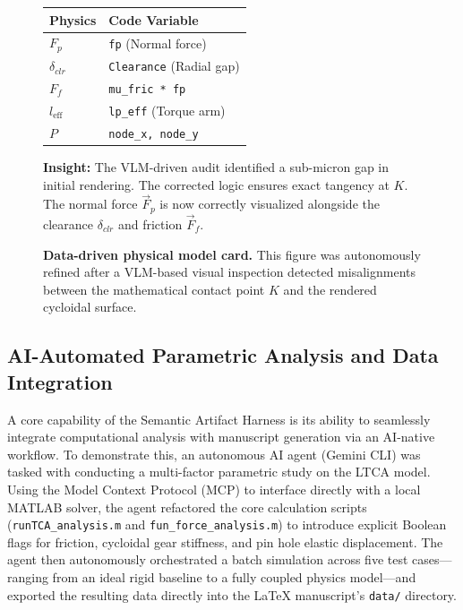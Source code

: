 \documentclass{article}
\begin{document}
\begin{figure}[t]
\begin{tcolorbox}[colback=green!2!white,colframe=green!50!black,title=Artifact Mapping Card: Floating Pin \& Friction Model,arc=4mm,boxrule=1pt]
\begin{minipage}{0.4\textwidth}
\begin{tabular}{>{\bfseries}p{1.25cm}p{3.7cm}}
\toprule
Physics & Code Variable \\
\midrule
$F_p$ & \texttt{fp} (Normal force) \\
$\delta_{clr}$ & \texttt{Clearance} (Radial gap) \\
$F_f$ & \texttt{mu\_fric * fp} \\
$l_{\mathrm{eff}}$ & \texttt{lp\_eff} (Torque arm) \\
$P$ & \texttt{node\_x, node\_y} \\
\bottomrule
\end{tabular}
\vspace{2mm}

\textbf{Insight:} The VLM-driven audit identified a sub-micron gap in initial rendering. The corrected logic ensures exact tangency at $K$. The normal force $\vec{F}_p$ is now correctly visualized alongside the clearance $\delta_{clr}$ and friction $\vec{F}_f$.
\end{minipage}
\end{tcolorbox}
\caption{\textbf{Data-driven physical model card.} This figure was autonomously refined after a VLM-based visual inspection detected misalignments between the mathematical contact point $K$ and the rendered cycloidal surface.}
\label{fig:physical_model}
\end{figure}

\subsection{AI-Automated Parametric Analysis and Data Integration}

A core capability of the Semantic Artifact Harness is its ability to seamlessly integrate computational analysis with manuscript generation via an AI-native workflow. To demonstrate this, an autonomous AI agent (Gemini CLI) was tasked with conducting a multi-factor parametric study on the LTCA model. Using the Model Context Protocol (MCP) to interface directly with a local MATLAB solver, the agent refactored the core calculation scripts (\texttt{runTCA\_analysis.m} and \texttt{fun\_force\_analysis.m}) to introduce explicit Boolean flags for friction, cycloidal gear stiffness, and pin hole elastic displacement. The agent then autonomously orchestrated a batch simulation across five test cases---ranging from an ideal rigid baseline to a fully coupled physics model---and exported the resulting data directly into the LaTeX manuscript's \texttt{data/} directory.
\end{document}
